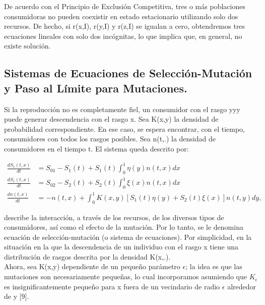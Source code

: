 \documentclass[letterpaper]{article}
\begin{document}
{        \normalsize{De acuerdo con el Principio de Exclusión Competitiva, tres o más poblaciones consumidoras no pueden coexistir en estado estacionario utilizando solo dos recursos. De hecho, si r(x,I), r(y,I) y r(z,I) se igualan a cero, obtendremos tres ecuaciones lineales con solo dos incógnitas, lo que implica que, en general, no existe solución.}\\


        
        \subsection{Sistemas de Ecuaciones de Selección-Mutación y Paso al Límite para Mutaciones.}

        \normalsize{Si la reproducción no es completamente fiel, un consumidor con el rasgo yyy puede generar descendencia con el rasgo x. Sea K(x,y) la densidad de probabilidad correspondiente. En ese caso, se espera encontrar, con el tiempo, consumidores con todos los rasgos posibles. Sea n(t,.) la densidad de consumidores en el tiempo t. El sistema queda descrito por:}

        \begin{equation}
            \begin{split}
                \frac{d S_1(t,x)}{dt}&=S_{01}-S_1(t)+S_1(t)\int_{0}^{1}\eta(y)n(t,x)dx\\
               \frac{d S_1(t,x)}{dt}&=S_{02}-S_2(t)+S_2(t)\int_{0}^{1}\xi(x)n(t,x)dx\\
              \frac{d n(t,x)}{dt}&=-n(t,x)+\int_{0}^{1}K(x,y)[S_1(t)\eta(y)+S_2(t)\xi(x)]n(t,y)dy,
            \end{split}
        \end{equation}

        \normalsize{describe la interacción, a través de los recursos, de los diversos tipos de consumidores, así como el efecto de la mutación. Por lo tanto, se le denomina ecuación de selección-mutación (o sistema de ecuaciones). Por simplicidad, en la situación en la que la descendencia de un individuo con el rasgo x tiene una distribución de rasgos descrita por la densidad K(x,.).}\\

        \normalsize{Ahora, sea K(x,y) dependiente de un pequeño parámetro $\epsilon$; la idea es que las mutaciones son necesariamente pequeñas, lo cual incorporamos asumiendo que $K_\epsilon$ es insignificantemente pequeño para x fuera de un vecindario de radio $\epsilon$ alrededor de y [9].}\\

}
\end{document}
